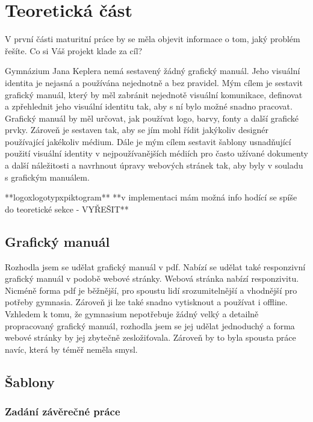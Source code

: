 \documentclass[11pt,a4paper,twoside,openright]{report}
\begin{document}


\setcounter{tocdepth}{2}
\tableofcontents

\chapter{Teoretická část}
\pagestyle{fancy}

V první části maturitní práce by se měla objevit informace o tom, jaký problém řešíte. Co si Váš projekt klade za cíl?

Gymnázium Jana Keplera nemá sestavený žádný grafický manuál. Jeho visuální identita je nejasná a používána nejednotně a bez pravidel. Mým cílem je sestavit grafický manuál, který by měl zabránit nejednotě visuální komunikace, definovat a zpřehlednit jeho visuální identitu tak, aby s ní bylo možné snadno pracovat. Grafický manuál by měl určovat, jak používat logo, barvy, fonty a další grafické prvky. Zároveň je sestaven tak, aby se jím mohl řídit jakýkoliv designér používající jakékoliv médium.
Dále je mým cílem sestavit šablony usnadňující použití visuální identity v nejpoužívanějších médiích pro často užívané dokumenty a další náležitosti a navrhnout úpravy webových stránek tak, aby byly v souladu s grafickým manuálem.

**logoxlogotypxpiktogram**
**v implementaci mám možná info hodící se spíše do teoretické sekce - VYŘEŠIT**

\section{Grafický manuál}
Rozhodla jsem se udělat grafický manuál v pdf. Nabízí se udělat také responzivní grafický manuál v podobě webové stránky. Webová stránka nabízí responzivitu. Nicméně forma pdf je běžnější, pro spoustu lidí srozumitelnější a vhodnější pro potřeby gymnasia. Zároveň ji lze také snadno vytisknout a používat i offline. Vzhledem k tomu, že gymnasium nepotřebuje žádný velký a detailně propracovaný grafický manuál, rozhodla jsem se jej udělat jednoduchý a forma webové stránky by jej zbytečně zesložiťovala. Zároveň by to byla spousta práce navíc, která by téměř neměla smysl.

\section{Šablony}
\subsection{Zadání závěrečné práce}
\end{document}
